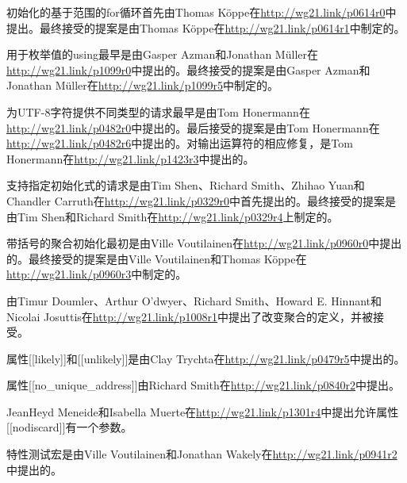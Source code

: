 初始化的基于范围的for循环首先由Thomas Köppe在\url{http://wg21.link/p0614r0}中提出。最终接受的提案是由Thomas Köppe在\url{http://wg21.link/p0614r1}中制定的。

用于枚举值的using最早是由Gasper Azman和Jonathan M{\"u}ller在\url{http://wg21.link/p1099r0}中提出的。最终接受的提案是由Gasper Azman和Jonathan M{\"u}ller在{}\url{http://wg21.link/p1099r5}中制定的。

为UTF-8字符提供不同类型的请求最早是由Tom Honermann在\url{http://wg21.link/p0482r0}中提出的。最后接受的提案是由Tom Honermann在\url{http://wg21.link/p0482r6}中提出的。对输出运算符的相应修复，是Tom Honermann在\url{http://wg21.link/p1423r3}中提出的。

支持指定初始化式的请求是由Tim Shen、Richard Smith、Zhihao Yuan和Chandler Carruth在\url{http://wg21.link/p0329r0}中首先提出的。最终接受的提案是由Tim Shen和Richard Smith在\url{http://wg21.link/p0329r4}上制定的。

带括号的聚合初始化最初是由Ville Voutilainen在\url{http://wg21.link/p0960r0}中提出的。最终接受的提案是由Ville Voutilainen和Thomas Köppe在\url{http://wg21.link/p0960r3}中制定的。

由Timur Doumler、Arthur O’dwyer、Richard Smith、Howard E. Hinnant和Nicolai Josuttis在\url{http://wg21.link/p1008r1}中提出了改变聚合的定义，并被接受。

属性[[likely]]和[[unlikely]]是由Clay Trychta在\url{http://wg21.link/p0479r5}中提出的。

属性[[no\_unique\_address]]由Richard Smith在\url{http://wg21.link/p0840r2}中提出。

JeanHeyd Meneide和Isabella Muerte在\url{http://wg21.link/p1301r4}中提出允许属性[[nodiscard]]有一个参数。

特性测试宏是由Ville Voutilainen和Jonathan Wakely在\url{http://wg21.link/p0941r2}中提出的。





